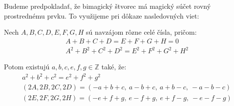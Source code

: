 

Budeme predpokladať, že bimagický štvorec má magický súčet rovný prostrednému prvku. To využijeme pri dôkaze nasledovných viet:

\begin{theorem}
\label{5x5bimagic2}
Nech $A,B,C,D,E,F,G,H$ sú navzájom rôzne celé čísla, pričom:
\begin{gather*}
A + B + C + D = E + F + G + H = 0 \\
A^2 + B^2 + C^2 + D^2 = E^2 + F^2 + G^2 + H^2
\end{gather*}

Potom existujú $a,b,c,e,f,g \in \mathbb{Z}$ také, že:
\begin{gather*}
a^2 + b^2 + c^2 = e^2 + f^2 + g^2 \\
(2A,2B,2C,2D) = (-a+b+c,~a-b+c,~a+b-c,~-a-b-c) \\
(2E,2F,2G,2H) = (-e+f+g,~e-f+g,~e+f-g,~-e-f-g)
\end{gather*}

\end{theorem}

